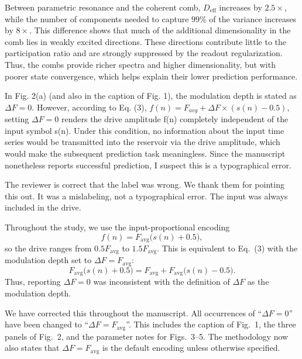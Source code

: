 \documentclass{ar2rc}
\begin{document}
Between parametric resonance and the coherent comb, $D_{\mathrm{eff}}$ increases by $2.5\times$, while the number of components needed to capture $99\%$ of the variance increases by $8\times$. This difference shows that much of the additional dimensionality in the comb lies in weakly excited directions. These directions contribute little to the participation ratio and are strongly suppressed by the readout regularization. Thus, the combs provide richer spectra and higher dimensionality, but with poorer state convergence, which helps explain their lower prediction performance.

\RC \label{rev:1.3}In Fig. 2(a) (and also in the caption of Fig. 1), the modulation depth is stated as $\Delta F = 0$. However, according to Eq. (3), $f\left(n\right)=F_{avg}+\Delta F\times\left(s\left(n\right)-0.5\right)$, setting $\Delta F = 0$ renders the drive amplitude f(n) completely independent of the input symbol s(n). Under this condition, no information about the input time series would be transmitted into the reservoir via the drive amplitude, which would make the subsequent prediction task meaningless. Since the manuscript nonetheless reports successful prediction, I suspect this is a typographical error.

\AR The reviewer is correct that the label was wrong. We thank them for pointing this out. It was a mislabeling, not a typographical error. The input was always included in the drive.

Throughout the study, we use the input-proportional encoding
\begin{equation}
	f(n) = F_{\mathrm{avg}}\bigl(s(n)+0.5\bigr),
\end{equation}
so the drive ranges from $0.5F_{\mathrm{avg}}$ to $1.5F_{\mathrm{avg}}$. This is equivalent to Eq.~(3) with the modulation depth set to $\Delta F = F_{\mathrm{avg}}$:
\begin{equation}
F_{\mathrm{avg}}\bigl(s(n)+0.5\bigr) = F_{\mathrm{avg}} + F_{\mathrm{avg}}\bigl(s(n)-0.5\bigr).
\end{equation}
Thus, reporting $\Delta F=0$ was inconsistent with the definition of $\Delta F$ as the modulation depth.

We have corrected this throughout the manuscript. All occurrences of ``$\Delta F=0$'' have been changed to ``$\Delta F=F_{\mathrm{avg}}$''. This includes the caption of Fig.~1, the three panels of Fig.~2, and the parameter notes for Figs.~3--5. The methodology now also states that $\Delta F=F_{\mathrm{avg}}$ is the default encoding unless otherwise specified.
\end{document}
